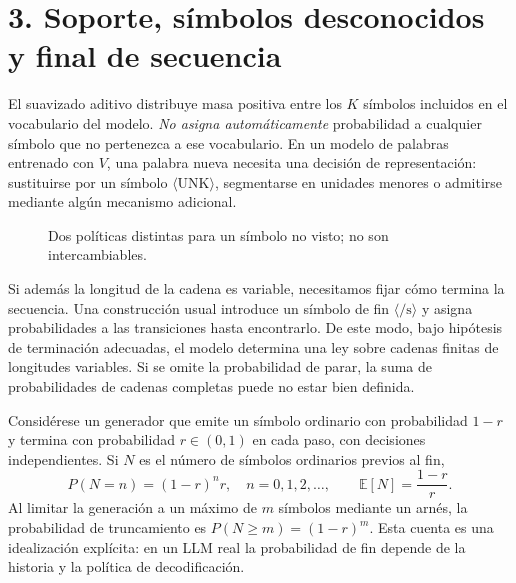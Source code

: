\section*{3. Soporte, símbolos desconocidos y final de secuencia}
El suavizado aditivo distribuye masa positiva entre los $K$ símbolos
incluidos en el vocabulario del modelo. \emph{No asigna automáticamente}
probabilidad a cualquier símbolo que no pertenezca a ese vocabulario.
En un modelo de palabras entrenado con $V$, una palabra nueva necesita
una decisión de representación: sustituirse por un símbolo
$\langle\mathrm{UNK}\rangle$, segmentarse en unidades menores o
admitirse mediante algún mecanismo adicional.

\begin{figure}[H]\centering
{}
\caption{Dos políticas distintas para un símbolo no visto; no son intercambiables.}
\end{figure}

Si además la longitud de la cadena es variable, necesitamos fijar
cómo termina la secuencia. Una construcción usual introduce un símbolo
de fin $\langle/\mathrm{s}\rangle$ y asigna probabilidades a las
transiciones hasta encontrarlo. De este modo, bajo hipótesis de
terminación adecuadas, el modelo determina una ley sobre cadenas
finitas de longitudes variables. Si se omite la probabilidad de parar,
la suma de probabilidades de cadenas completas puede no estar
bien definida.

\begin{ejemplo}
Considérese un generador que emite un símbolo ordinario con probabilidad
$1-r$ y termina con probabilidad $r\in(0,1)$ en cada paso, con decisiones
independientes. Si $N$ es el número de símbolos ordinarios previos al fin,
\[
P(N=n)=(1-r)^nr,\quad n=0,1,2,\ldots,
\qquad \mathbb E[N]=\frac{1-r}{r}.
\]
Al limitar la generación a un máximo de $m$ símbolos mediante un arnés,
la probabilidad de truncamiento es $P(N\ge m)=(1-r)^m$.
Esta cuenta es una idealización explícita: en un LLM real la probabilidad
de fin depende de la historia y la política de decodificación.
\end{ejemplo}

